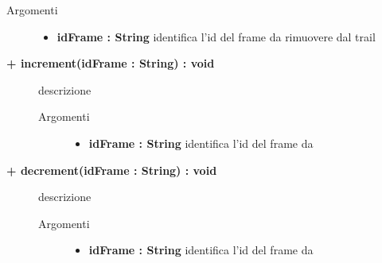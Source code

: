 \begin{description}
\begin{description}
		\begin{description}
			\item[Argomenti] \hfill
				\begin{itemize}
				
					\item \textbf{idFrame : String			} \hfill
						identifica l'id del frame da rimuovere dal trail
					
				\end{itemize}
		\end{description}
	\end{description}
	
	\begin{description}
		\item[\textbf{\color{blue}+ increment(idFrame : String) : void			}] \hfill
			descrizione %
			
		\begin{description}
			\item[Argomenti] \hfill
				\begin{itemize}
				
					\item \textbf{idFrame : String			} \hfill
						identifica l'id del frame da
					
				\end{itemize}
		\end{description}
	\end{description}
	
	\begin{description}
		\item[\textbf{\color{blue}+ decrement(idFrame : String) : void			}] \hfill
			descrizione %
			
		\begin{description}
			\item[Argomenti] \hfill
				\begin{itemize}
				
					\item \textbf{idFrame : String			} \hfill
						identifica l'id del frame da
					
				\end{itemize}
		\end{description}
	\end{description}
	

\end{description}
